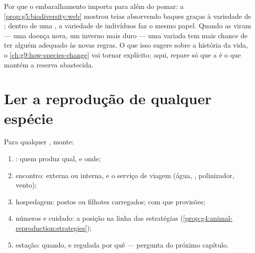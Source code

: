 \begin{remark}\label{rem:g8:sexual-reproduction:reserve}
Por que o embaralhamento importa para além do pomar: a
\cref{prop:g5:biodiversity:web} mostrou teias absorvendo baques
graças à variedade de ; dentro de uma , a variedade de
indivíduos faz o mesmo papel. Quando as  viram --- uma doença
nova, um inverno mais duro --- uma  variada tem mais chance de
ter alguém adequado às novas regras. O que isso sugere sobre a
história da vida, o \cref{ch:g9:how-species-change} vai tornar
explícito; aqui, repare só que a  é o que mantém a
reserva abastecida.
\end{remark}

\section{Ler a reprodução de qualquer espécie}

\begin{method}\label{met:g8:sexual-reproduction:dossier}
Para qualquer , monte:
\begin{enumerate}
  \item {}: quem produz qual, e onde;
  \item encontro:  externa ou interna, e o serviço de
        viagem (água, , polinizador, vento);
  \item hospedagem:  postos ou filhotes carregados; com que
        provisões;
  \item números e cuidado: a posição na linha das estratégias
        (\cref{prop:g4:animal-reproduction:strategies});
  \item estação: quando, e regulada por quê --- pergunta do próximo
        capítulo.
\end{enumerate}
\end{method}

